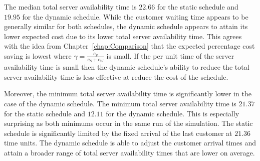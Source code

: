 The median total server availability time is $22.66$ for the static schedule and $19.95$ for the dynamic schedule. While the customer waiting time appears to be generally similar for both schedules, the dynamic schedule appears to attain its lower expected cost due to its lower total server availability time. This agrees with the idea from Chapter~\ref{chap:Comparison} that the expected percentage cost saving is lowest where $\gamma = \frac{c_{S}}{c_{S} + c_{W}}$ is small. If the per unit time of the server availability time is small then the dynamic schedule's ability to reduce the total server availability time is less effective at reduce the cost of the schedule.

Moreover, the minimum total server availability time is significantly lower in the case of the dynamic schedule. The minimum total server availability time is $21.37$ for the static schedule and $12.11$ for the dynamic schedule. This is especially surprising as both minimums occur in the same run of the simulation. The static schedule is significantly limited by the fixed arrival of the last customer at $21.36$ time units. The dynamic schedule is able to adjust the customer arrival times and attain a broader range of total server availability times that are lower on average.